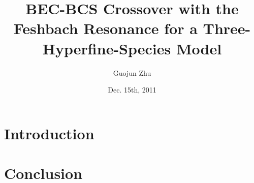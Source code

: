 \documentclass[handout,notes=show]{beamer}
\title[Crossover w/ 3-species]{BEC-BCS Crossover with the Feshbach Resonance for a Three-Hyperfine-Species Model}
\author[Guojun Zhu]{Guojun Zhu}
\institute{University of Illinois at Urbana-Champaign}
\date{Dec. 15th, 2011}
\begin{document}
\frame{
\titlepage}

\section[Outline]{}

\section{Introduction}
%


%


%
\section{Conclusion}
\frame{}


%
\end{document}
